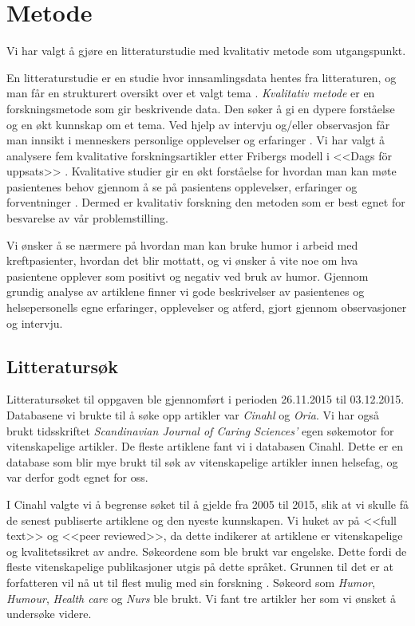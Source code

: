 \chapter{Metode}

Vi har valgt å gjøre en litteraturstudie med kvalitativ metode som
utgangspunkt.

En litteraturstudie er en studie hvor innsamlingsdata hentes fra litteraturen,
og man får en strukturert oversikt over et valgt tema \cite{segesten2006}.
\textit{Kvalitativ metode} er en forskningsmetode som gir beskrivende data. Den
søker å gi en dypere forståelse og en økt kunnskap om et tema. Ved hjelp av
intervju og/eller observasjon får man innsikt i menneskers personlige
opplevelser og erfaringer \cite{olsson2003}. Vi har valgt å analysere fem
kvalitative forskningsartikler etter Fribergs modell i <<Dags för uppsats>>
\citeyear{friberg2006}. Kvalitative studier gir en økt forståelse for hvordan
man kan møte pasientenes behov gjennom å se på pasientens opplevelser,
erfaringer og forventninger \cite{segesten2006}. Dermed er kvalitativ forskning
den metoden som er best egnet for besvarelse av vår problemstilling.

Vi ønsker å se nærmere på hvordan man kan bruke humor i arbeid med
kreftpasienter, hvordan det blir mottatt, og vi ønsker å vite noe om hva
pasientene opplever som positivt og negativ ved bruk av humor. Gjennom grundig
analyse av artiklene finner vi gode beskrivelser av pasientenes og
helsepersonells egne erfaringer, opplevelser og atferd, gjort gjennom
observasjoner og intervju.

\section{Litteratursøk}

Litteratursøket til oppgaven ble gjennomført i perioden 26.11.2015 til
03.12.2015. Databasene vi brukte til å søke opp artikler var \textit{Cinahl} og
\textit{Oria}. Vi har også brukt tidsskriftet \textit{Scandinavian Journal of
Caring Sciences'} egen søkemotor for vitenskapelige artikler. De fleste
artiklene fant vi i databasen Cinahl. Dette er en database som blir mye brukt
til søk av vitenskapelige artikler innen helsefag, og var derfor godt egnet for
oss.

I Cinahl valgte vi å begrense søket til å gjelde fra 2005 til 2015, slik at vi
skulle få de senest publiserte artiklene og den nyeste kunnskapen. Vi huket av
på <<full text>> og <<peer reviewed>>, da dette indikerer at artiklene er
vitenskapelige og kvalitetssikret av andre. Søkeordene som ble brukt var
engelske. Dette fordi de fleste vitenskapelige publikasjoner utgis på dette
språket. Grunnen til det er at forfatteren vil nå ut til flest mulig med sin
forskning \cite{friberg2006}. Søkeord som \textit{Humor}, \textit{Humour},
\textit{Health care} og \textit{Nurs} ble brukt. Vi fant tre artikler her som
vi ønsket å undersøke videre.

